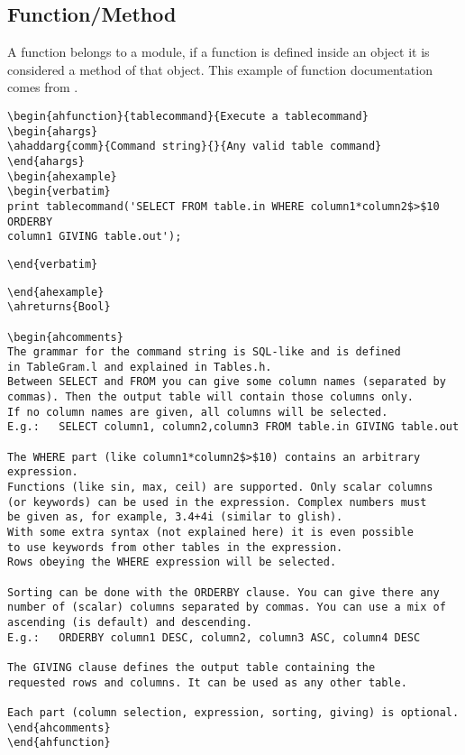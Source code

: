 \subsection{Function/Method}
A function belongs to a module, if a function is defined inside an
object it is considered a method of that object. 
\label{197doc:function_example}
This example of function documentation comes from
.
\begin{verbatim}
\begin{ahfunction}{tablecommand}{Execute a tablecommand}
\begin{ahargs}
\ahaddarg{comm}{Command string}{}{Any valid table command}
\end{ahargs}
\begin{ahexample}
\begin{verbatim}
print tablecommand('SELECT FROM table.in WHERE column1*column2$>$10 ORDERBY 
column1 GIVING table.out');
\end{verbatim}
\verb!\end{verbatim}!
\begin{verbatim}
\end{ahexample}
\ahreturns{Bool}

\begin{ahcomments}
The grammar for the command string is SQL-like and is defined
in TableGram.l and explained in Tables.h.
Between SELECT and FROM you can give some column names (separated by
commas). Then the output table will contain those columns only.
If no column names are given, all columns will be selected.
E.g.:   SELECT column1, column2,column3 FROM table.in GIVING table.out

The WHERE part (like column1*column2$>$10) contains an arbitrary expression.
Functions (like sin, max, ceil) are supported. Only scalar columns
(or keywords) can be used in the expression. Complex numbers must
be given as, for example, 3.4+4i (similar to glish).
With some extra syntax (not explained here) it is even possible
to use keywords from other tables in the expression.
Rows obeying the WHERE expression will be selected.

Sorting can be done with the ORDERBY clause. You can give there any
number of (scalar) columns separated by commas. You can use a mix of
ascending (is default) and descending.
E.g.:   ORDERBY column1 DESC, column2, column3 ASC, column4 DESC

The GIVING clause defines the output table containing the
requested rows and columns. It can be used as any other table.

Each part (column selection, expression, sorting, giving) is optional.
\end{ahcomments}
\end{ahfunction}
\end{verbatim}
